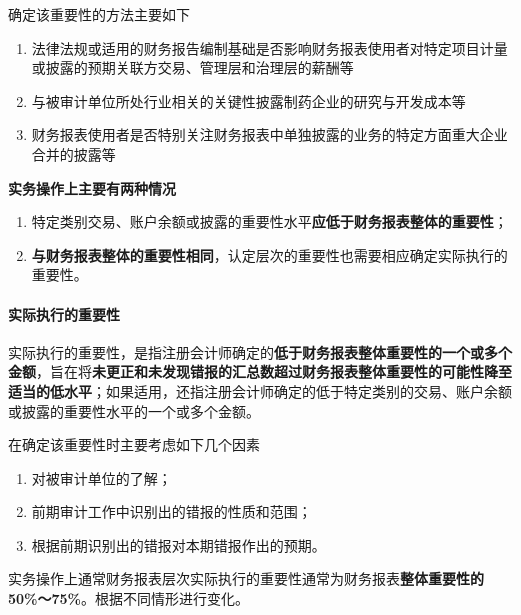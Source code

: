 \documentclass[UTF8,12pt]{ctexart}
\numberwithin{equation}{section} %
\numberwithin{figure}{section}
\numberwithin{table}{section}
\begin{document}
	确定该重要性的方法主要如下
	\begin{enumerate}
		\item 法律法规或适用的财务报告编制基础是否影响财务报表使用者对特定项目计量或披露的预期关联方交易、管理层和治理层的薪酬等
		
		\item 与被审计单位所处行业相关的关键性披露制药企业的研究与开发成本等
		
		\item 财务报表使用者是否特别关注财务报表中单独披露的业务的特定方面重大企业合并的披露等
	\end{enumerate}
	
	\textbf{实务操作上主要有两种情况}
	\begin{enumerate}
		\item 特定类别交易、账户余额或披露的重要性水平\textbf{应低于财务报表整体的重要性}；
		
		\item \textbf{与财务报表整体的重要性相同}，认定层次的重要性也需要相应确定实际执行的重要性。
	\end{enumerate}

	
	\paragraph{实际执行的重要性}
	
	实际执行的重要性，是指注册会计师确定的\textbf{低于财务报表整体重要性的一个或多个金额}，旨在将\textbf{未更正和未发现错报的汇总数超过财务报表整体重要性的可能性降至适当的低水平}；如果适用，还指注册会计师确定的低于特定类别的交易、账户余额或披露的重要性水平的一个或多个金额。
	
	在确定该重要性时主要考虑如下几个因素
	\begin{enumerate}
		\item 对被审计单位的了解；
		
		\item 前期审计工作中识别出的错报的性质和范围；
		
		\item 根据前期识别出的错报对本期错报作出的预期。
	\end{enumerate}
	
	实务操作上通常财务报表层次实际执行的重要性通常为财务报表\textbf{整体重要性的50\%～75\%}。根据不同情形进行变化。
	
\end{document}
